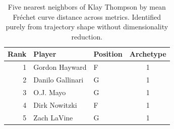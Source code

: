 \begin{table}[htbp]
  \centering\small
  \begin{tabular}{rllc}
    \toprule
    Rank & Player & Position & Archetype \\
    \midrule
    1 & Gordon Hayward & F & 1 \\
    2 & Danilo Gallinari & G & 1 \\
    3 & O.J. Mayo & G & 1 \\
    4 & Dirk Nowitzki & F & 1 \\
    5 & Zach LaVine & G & 1 \\
    \bottomrule
  \end{tabular}
  \caption{Five nearest neighbors of Klay Thompson by mean Fr\'{e}chet curve distance across metrics. Identified purely from trajectory shape without dimensionality reduction.}
  \label{tab:Klay_Thompson_frechet_curve_neighbors}
\end{table}

